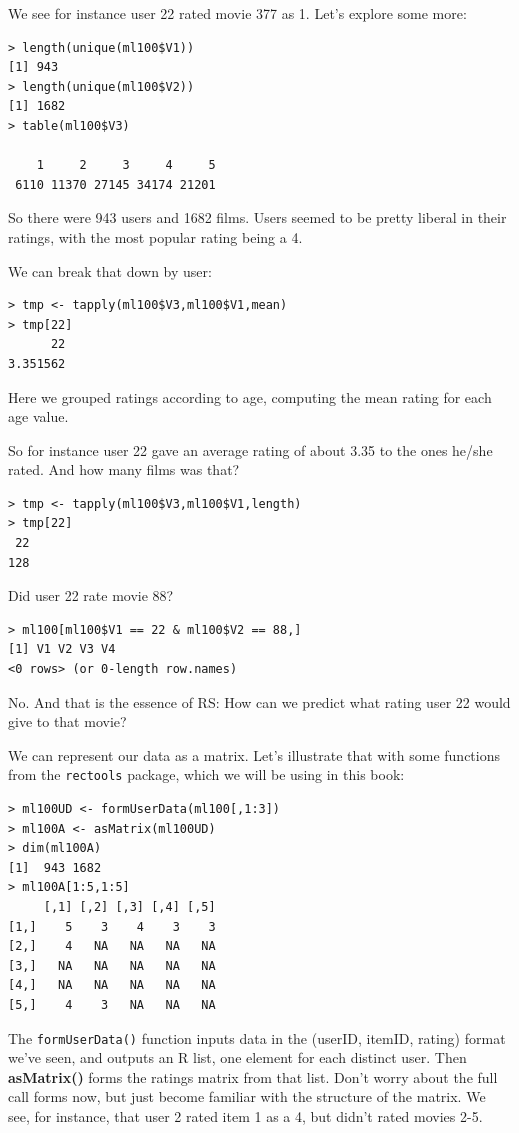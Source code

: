We see for instance user 22 rated movie 377 as 1.  Let's explore some more:

\begin{lstlisting}
> length(unique(ml100$V1))
[1] 943
> length(unique(ml100$V2))
[1] 1682
> table(ml100$V3)

    1     2     3     4     5 
 6110 11370 27145 34174 21201 
\end{lstlisting}

So there were 943 users and 1682 films.  Users seemed to be pretty
liberal in their ratings, with the most popular rating being a 4.

We can break that down by user:

\begin{lstlisting}
> tmp <- tapply(ml100$V3,ml100$V1,mean)
> tmp[22]
      22 
3.351562 
\end{lstlisting}

Here we grouped ratings according to age, computing the mean rating for
each age value.

So for instance user 22 gave an average rating of about 3.35 to the ones
he/she rated.  And how many films was that?

\begin{lstlisting}
> tmp <- tapply(ml100$V3,ml100$V1,length)
> tmp[22]
 22 
128 
\end{lstlisting}

Did user 22 rate movie 88?

\begin{lstlisting}
> ml100[ml100$V1 == 22 & ml100$V2 == 88,]
[1] V1 V2 V3 V4
<0 rows> (or 0-length row.names)
\end{lstlisting}

No.  And that is the essence of RS:  How can we predict what rating user
22 would give to that movie?

We can represent our data as a matrix.  Let's illustrate that with some
functions from the \lstinline{rectools} package, which we will be using
in this book:

\begin{lstlisting}
> ml100UD <- formUserData(ml100[,1:3]) 
> ml100A <- asMatrix(ml100UD) 
> dim(ml100A)
[1]  943 1682
> ml100A[1:5,1:5] 
     [,1] [,2] [,3] [,4] [,5]
[1,]    5    3    4    3    3
[2,]    4   NA   NA   NA   NA
[3,]   NA   NA   NA   NA   NA
[4,]   NA   NA   NA   NA   NA
[5,]    4    3   NA   NA   NA
\end{lstlisting}

The \lstinline{formUserData()} function inputs data in the (userID,
itemID, rating) format we've seen, and outputs an R list, one element
for each distinct user.  Then \textbf{asMatrix()} forms the ratings
matrix from that list.  Don't worry about the full call forms now, but
just become familiar with the structure of the matrix.  We see, for
instance, that user 2 rated item 1 as a 4, but didn't rated movies 2-5.


